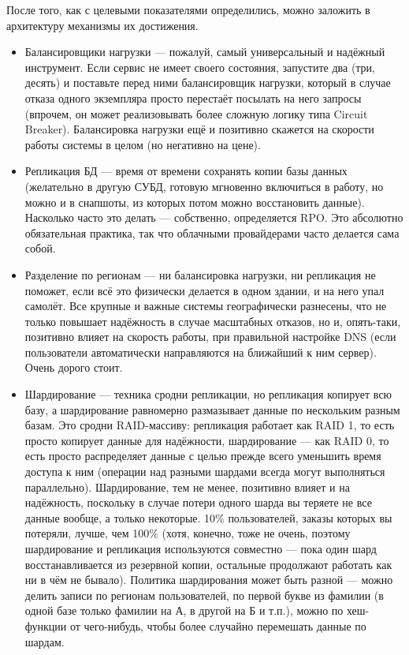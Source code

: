 \documentclass{../../text-style}
\begin{document}
После того, как с целевыми показателями определились, можно заложить в архитектуру механизмы их достижения.

\begin{itemize}
    \item Балансировщики нагрузки --- пожалуй, самый универсальный и надёжный инструмент. Если сервис не имеет своего состояния, запустите два (три, десять) и поставьте перед ними балансировщик нагрузки, который в случае отказа одного экземпляра просто перестаёт посылать на него запросы (впрочем, он может реализовывать более сложную логику типа Circuit Breaker). Балансировка нагрузки ещё и позитивно скажется на скорости работы системы в целом (но негативно на цене).
    \item Репликация БД --- время от времени сохранять копии базы данных (желательно в другую СУБД, готовую мгновенно включиться в работу, но можно и в снапшоты, из которых потом можно восстановить данные). Насколько часто это делать --- собственно, определяется RPO. Это абсолютно обязательная практика, так что облачными провайдерами часто делается сама собой.
    \item Разделение по регионам --- ни балансировка нагрузки, ни репликация не поможет, если всё это физически делается в одном здании, и на него упал самолёт. Все крупные и важные системы географически разнесены, что не только повышает надёжность в случае масштабных отказов, но и, опять-таки, позитивно влияет на скорость работы, при правильной настройке DNS (если пользователи автоматически направляются на ближайший к ним сервер). Очень дорого стоит.
    \item Шардирование --- техника сродни репликации, но репликация копирует всю базу, а шардирование равномерно размазывает данные по нескольким разным базам. Это сродни RAID-массиву: репликация работает как RAID 1, то есть просто копирует данные для надёжности, шардирование --- как RAID 0, то есть просто распределяет данные с целью прежде всего уменьшить время доступа к ним (операции над разными шардами всегда могут выполняться параллельно). Шардирование, тем не менее, позитивно влияет и на надёжность, поскольку в случае потери одного шарда вы теряете не все данные вообще, а только некоторые. 10\% пользователей, заказы которых вы потеряли, лучше, чем 100\% (хотя, конечно, тоже не очень, поэтому шардирование и репликация используются совместно --- пока один шард восстанавливается из резервной копии, остальные продолжают работать как ни в чём не бывало). Политика шардирования может быть разной --- можно делить записи по регионам пользователей, по первой букве из фамилии (в одной базе только фамилии на А, в другой на Б и т.п.), можно по хеш-функции от чего-нибудь, чтобы более случайно перемешать данные по шардам.
\end{itemize}
\end{document}

